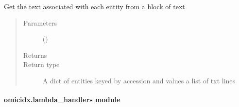 \documentclass[letterpaper,10pt,english]{sphinxmanual}
\begin{document}

\begin{fulllineitems}
\label{\detokenize{omicidx.geometa:omicidx.geometa.get_geo_entities}}
Get the text associated with each entity from a block of text
\begin{quote}\begin{description}
\item[{Parameters}] \leavevmode
{} (\sphinxstyleliteralemphasis{\sphinxupquote{(}}\sphinxstyleliteralemphasis{\sphinxupquote{)}}) \textendash{} 

\item[{Returns}] \leavevmode


\item[{Return type}] \leavevmode
A dict of entities keyed by accession and values a list of txt lines

\end{description}\end{quote}

\end{fulllineitems}


\begin{fulllineitems}
\label{\detokenize{omicidx.geometa:omicidx.geometa.get_subseries_from_relations}}
\end{fulllineitems}



\paragraph{omicidx.lambda\_handlers module}
\label{\detokenize{omicidx.lambda_handlers:module-omicidx.lambda_handlers}}\label{\detokenize{omicidx.lambda_handlers:omicidx-lambda-handlers-module}}\label{\detokenize{omicidx.lambda_handlers::doc}}
\end{document}
